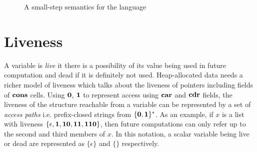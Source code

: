 \documentclass[10pt]{sigplanconf}
\begin{document}
\begin{figure*}[t!]
\begin{center}
\caption{A small-step semantics for the language}\label{fig:lang-semantics}
\end{center}
\end{figure*}


\renewcommand{\pp}[2]{\ensuremath{#1\!\!:\!#2}} %


\section{Liveness}\label{sec:liveness}

A variable is {\em live} it  there is a possibility of its value being
used  in future computation  and dead  if it  is definitely  not used.
Heap-allocated data needs a richer model of liveness which talks about
the  liveness of pointers  including fields  of $\mbox{$\mathbf{cons}$}$  cells.  Using
$\mathbf{0}$, $\mathbf{1}$  to represent access using $\mbox{$\mathbf{car}$}$  and $\mbox{$\mathbf{cdr}$}$ fields,
the  liveness  of the  structure  reachable  from  a variable  can  be
represented by a set of {\em access paths} i.e.  prefix-closed strings
from $\{\mathbf{0},\mathbf{1}\}^\ast$.   As an  example, if $x$  is a  list with
liveness      $\{\epsilon,     \mathbf{1},      \mathbf{1}\mathbf{0},     \mathbf{1}\mathbf{1},
\mathbf{1}\mathbf{1}\mathbf{0}\}$, then future computations  can only refer up to the
second and third  members of $x$. In this  notation, a scalar variable
being live or dead are represented as $\{\epsilon\}$ and $\{\}$ respectively.
\end{document}
